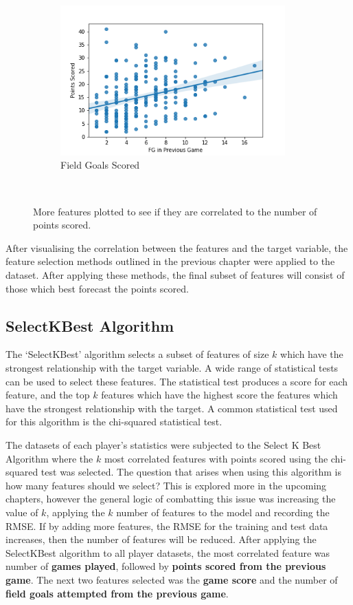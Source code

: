 \documentclass[a4paper,11pt,twoside]{article}
\begin{document}
\begin{figure} [h!]
{\begin{subfigure}[b]{.45\textwidth}
\centering
\includegraphics[width=0.95\textwidth]{../fgoals_pts.png}
\caption{Field Goals Scored}
\end{subfigure}%
}\\
\caption{More features plotted to see if they are correlated to  the number of points scored.}
\end{figure}



After visualising the correlation between the features and the target variable, the feature selection methods outlined in the previous chapter were applied to the dataset. After applying these methods, the final subset of features will consist of those which best forecast the points scored.

\subsection{SelectKBest Algorithm}
The `SelectKBest' algorithm selects a subset of features of size $k$ which have the strongest relationship with the target variable. A wide range of statistical tests can be used to select these features. The statistical test produces a score for each feature, and the top $k$ features which have the highest score the features which have the strongest relationship with the target. A common statistical test used for this algorithm is the chi-squared statistical test.  

The datasets of each player's statistics were subjected to the Select K Best Algorithm where the $k$ most correlated features with points scored using the chi-squared test was selected. The question that arises when using this algorithm is how many features should we select? This is explored more in the upcoming chapters, however the general logic of combatting this issue was increasing the value of $k$, applying the $k$ number of features to the model and recording the RMSE. If by adding more features, the RMSE for the training and test data increases, then the number of features will be reduced. After applying the SelectKBest algorithm to all player datasets, the most correlated feature was number of \textbf{games played}, followed by \textbf{points scored from the previous game}. The next two features selected was the \textbf{game score} and the number of \textbf{field goals attempted from the previous game}.
\end{document}
